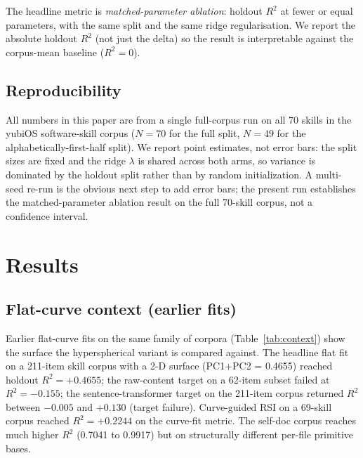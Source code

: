 \documentclass[11pt,a4paper]{article}
\begin{document}
The headline metric is \emph{matched-parameter ablation}: holdout $R^2$ at fewer or equal parameters, with the same split and the same ridge regularisation. We report the absolute holdout $R^2$ (not just the delta) so the result is interpretable against the corpus-mean baseline ($R^2 = 0$).

\subsection{Reproducibility}

All numbers in this paper are from a single full-corpus run on all 70 skills in the yubiOS software-skill corpus ($N=70$ for the full split, $N=49$ for the alphabetically-first-half split). We report point estimates, not error bars: the split sizes are fixed and the ridge $\lambda$ is shared across both arms, so variance is dominated by the holdout split rather than by random initialization. A multi-seed re-run is the obvious next step to add error bars; the present run establishes the matched-parameter ablation result on the full 70-skill corpus, not a confidence interval.

\section{Results}

\subsection{Flat-curve context (earlier fits)}

Earlier flat-curve fits on the same family of corpora (Table~\ref{tab:context}) show the surface the hyperspherical variant is compared against. The headline flat fit on a 211-item skill corpus with a 2-D surface (PC1+PC2 = 0.4655) reached holdout $R^2 = +0.4655$; the raw-content target on a 62-item subset failed at $R^2 = -0.155$; the sentence-transformer target on the 211-item corpus returned $R^2$ between $-0.005$ and $+0.130$ (target failure). Curve-guided RSI on a 69-skill corpus reached $R^2 = +0.2244$ on the curve-fit metric. The self-doc corpus reaches much higher $R^2$ (0.7041 to 0.9917) but on structurally different per-file primitive bases.
\end{document}
